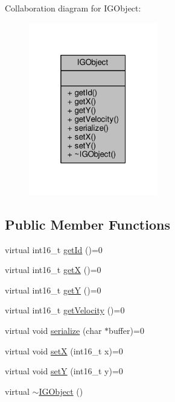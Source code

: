 Collaboration diagram for I\+G\+Object\+:\nopagebreak
\begin{figure}[H]
\begin{center}
\leavevmode
\includegraphics[width=160pt]{class_i_g_object__coll__graph}
\end{center}
\end{figure}
\subsection*{Public Member Functions}
\begin{DoxyCompactItemize}
\item 
virtual int16\+\_\+t \hyperlink{class_i_g_object_a40fdbe0db5e995e22996567d77bf45c6}{get\+Id} ()=0
\item 
virtual int16\+\_\+t \hyperlink{class_i_g_object_aa6ae1f7bd99277a3558a8e90d833fa7a}{get\+X} ()=0
\item 
virtual int16\+\_\+t \hyperlink{class_i_g_object_a3491bdb3a6b6ba8d66e07443a5b5951d}{get\+Y} ()=0
\item 
virtual int16\+\_\+t \hyperlink{class_i_g_object_afc8764ec832e6a60c58dace401d65b32}{get\+Velocity} ()=0
\item 
virtual void \hyperlink{class_i_g_object_a6e2dd93acb47fc77668e2571bff3481e}{serialize} (char $\ast$buffer)=0
\item 
virtual void \hyperlink{class_i_g_object_a4b810d1b4a785d7532104113ef5cf0ba}{set\+X} (int16\+\_\+t x)=0
\item 
virtual void \hyperlink{class_i_g_object_a5092ff8b79a61c3856510adb0543f229}{set\+Y} (int16\+\_\+t y)=0
\item 
virtual \hyperlink{class_i_g_object_a9e22adafd5adb2ed8dcb20a90ea6df6d}{$\sim$\+I\+G\+Object} ()
\end{DoxyCompactItemize}


